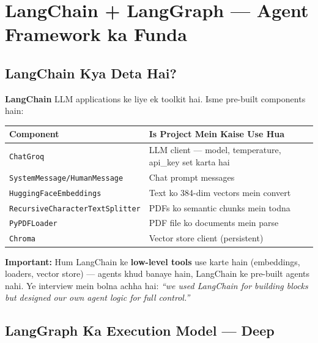 \documentclass[11pt, a4paper]{article}
\begin{document}
\section{LangChain + LangGraph --- Agent Framework ka Funda}

\subsection{LangChain Kya Deta Hai?}

\begin{conceptbox}
\textbf{LangChain} LLM applications ke liye ek toolkit hai. Isme pre-built components hain:

\begin{longtable}{p{4cm} p{9cm}}
\toprule
\textbf{Component} & \textbf{Is Project Mein Kaise Use Hua} \\
\midrule
\texttt{ChatGroq} & LLM client --- model, temperature, api\_key set karta hai \\
\texttt{SystemMessage/HumanMessage} & Chat prompt messages \\
\texttt{HuggingFaceEmbeddings} & Text ko 384-dim vectors mein convert \\
\texttt{RecursiveCharacterTextSplitter} & PDFs ko semantic chunks mein todna \\
\texttt{PyPDFLoader} & PDF file ko documents mein parse \\
\texttt{Chroma} & Vector store client (persistent) \\
\bottomrule
\end{longtable}

\textbf{Important:} Hum LangChain ke \textbf{low-level tools} use karte hain (embeddings, loaders, vector store) --- agents khud banaye hain, LangChain ke pre-built agents nahi. Ye interview mein bolna achha hai: \textit{``we used LangChain for building blocks but designed our own agent logic for full control.''}
\end{conceptbox}

\subsection{LangGraph Ka Execution Model --- Deep}
\end{document}
